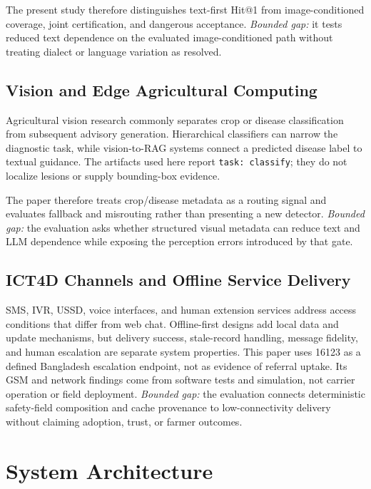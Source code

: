 \documentclass[11pt,a4paper]{article}
\begin{document}
The present study therefore distinguishes text-first Hit@1 from image-conditioned coverage, joint certification, and dangerous acceptance. \textit{Bounded gap:} it tests reduced text dependence on the evaluated image-conditioned path without treating dialect or language variation as resolved.

\subsection{Vision and Edge Agricultural Computing}
Agricultural vision research commonly separates crop or disease classification from subsequent advisory generation. Hierarchical classifiers can narrow the diagnostic task, while vision-to-RAG systems connect a predicted disease label to textual guidance. The artifacts used here report \texttt{task: classify}; they do not localize lesions or supply bounding-box evidence.

The paper therefore treats crop/disease metadata as a routing signal and evaluates fallback and misrouting rather than presenting a new detector. \textit{Bounded gap:} the evaluation asks whether structured visual metadata can reduce text and LLM dependence while exposing the perception errors introduced by that gate.

\subsection{ICT4D Channels and Offline Service Delivery}
SMS, IVR, USSD, voice interfaces, and human extension services address access conditions that differ from web chat. Offline-first designs add local data and update mechanisms, but delivery success, stale-record handling, message fidelity, and human escalation are separate system properties. This paper uses 16123 as a defined Bangladesh escalation endpoint, not as evidence of referral uptake. Its GSM and network findings come from software tests and simulation, not carrier operation or field deployment. \textit{Bounded gap:} the evaluation connects deterministic safety-field composition and cache provenance to low-connectivity delivery without claiming adoption, trust, or farmer outcomes.


\section{System Architecture}
\label{sec:architecture}
\end{document}
